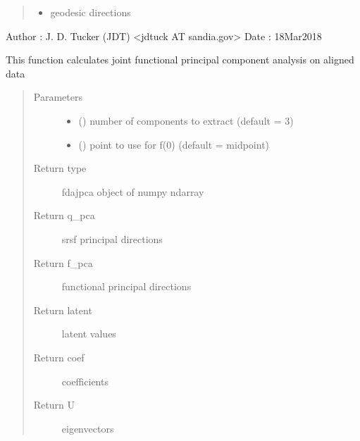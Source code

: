 \documentclass[letterpaper,10pt,english]{sphinxmanual}
\begin{document}
\begin{fulllineitems}
\begin{quote}
\begin{description}
\begin{itemize}
\item {} 
 \textendash{} geodesic directions

\end{itemize}

\end{description}\end{quote}

Author :  J. D. Tucker (JDT) \textless{}jdtuck AT sandia.gov\textgreater{}
Date   :  18\sphinxhyphen{}Mar\sphinxhyphen{}2018

\begin{fulllineitems}
\label{\detokenize{fPCA:fPCA.fdajpca.calc_fpca}}
This function calculates joint functional principal component analysis
on aligned data
\begin{quote}\begin{description}
\item[{Parameters}] \leavevmode\begin{itemize}
\item {} 
 () \textendash{} number of components to extract (default = 3)

\item {} 
 () \textendash{} point to use for f(0) (default = midpoint)

\end{itemize}

\item[{Return type}] \leavevmode
fdajpca object of numpy ndarray

\item[{Return q\_pca}] \leavevmode
srsf principal directions

\item[{Return f\_pca}] \leavevmode
functional principal directions

\item[{Return latent}] \leavevmode
latent values

\item[{Return coef}] \leavevmode
coefficients

\item[{Return U}] \leavevmode
eigenvectors


\end{description}
\end{quote}
\end{fulllineitems}
\end{fulllineitems}
\end{document}
